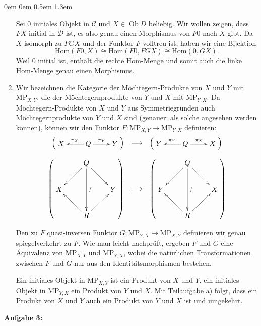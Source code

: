 \documentclass[a4paper,ngerman]{scrartcl}
\theoremstyle{definition}
\theoremstyle{plain}
\theoremstyle{remark}
\newcommand{\C}{\mathcal{C}}
\newcommand{\Hom}{\mathrm{Hom}}
\newcommand{\MP}{\mathrm{MP}}
\DeclareMathOperator{\Ob}{Ob}
\newcommand{\D}{\mathcal{D}}
\begin{document}
\begin{list}{}{0em \leftmargin0em \itemindent0.5em \itemsep 1.3em}
\begin{enumerate}
Sei $0$ initiales Objekt in $\C$ und $X \in \Ob D$ beliebig. Wir wollen zeigen, dass $FX$ initial in $\D$ ist, es also genau einen Morphismus von $F0$ nach $X$ gibt.
Da $X$ isomorph zu $FGX$ und der Funktor $F$ volltreu ist, haben wir eine Bijektion
\[ \Hom(F0, X) \cong \Hom(F0, FGX) \cong \Hom(0, GX). \]
Weil $0$ initial ist, enthält die rechte Hom-Menge und somit auch die linke Hom-Menge genau einen Morphismus.
\item Wir bezeichnen die Kategorie der Möchtegern-Produkte von $X$ und $Y$ mit $\MP_{X,Y}$, die der Möchtegernprodukte von $Y$ und $X$ mit $\MP_{Y,X}$. Da Möchtegern-Produkte von $X$ und $Y$ aus Symmetriegründen auch Möchtegernprodukte von $Y$ und $X$ sind (genauer: als solche angesehen werden können), können wir den Funktor $F : \MP_{X,Y} \to \MP_{Y,X}$ definieren:
\[ \begin{array}{@{}rcl@{}}
  \left(\vcenter{\xymatrix{X & \ar[l]_{\pi_X} Q \ar[r]^{\pi_Y} & Y}}\right) & \longmapsto & \left(\vcenter{\xymatrix{Y & \ar[l]_{\pi_Y} Q \ar[r]^{\pi_X} & X}}\right) \\\\
  \left(\vcenter{\xymatrix{
    & Q \ar[ld] \ar[dd]^{f} \ar[rd] \\
  X & & Y \\
    & R \ar[lu] \ar[ru]
  }}\right)
  & \longmapsto &
  \left(\vcenter{\xymatrix{
    & Q \ar[ld] \ar[dd]^{f} \ar[rd] \\
  Y & & X \\
    & R \ar[lu] \ar[ru]
  }}\right)
\end{array} \]

Den zu $F$ quasi-inversen Funktor $G:\MP_{Y,X} \to \MP_{X,Y}$ definieren wir genau spiegelverkehrt zu $F$. Wie man leicht nachprüft, ergeben $F$ und $G$ eine Äquivalenz von $\MP_{X,Y}$ und $\MP_{Y,X}$, wobei die natürlichen Transformationen zwischen $F$ und $G$ nur aus den Identitätsmorphismen bestehen.

Ein initiales Objekt in $\MP_{X,Y}$ ist ein Produkt von $X$ und $Y$, ein initiales Objekt in $\MP_{Y,X}$ ein Produkt von $Y$ und $X$. Mit Teilaufgabe a) folgt, dass ein Produkt von $X$ und $Y$ auch ein Produkt von $Y$ und $X$ ist und umgekehrt.

\end{enumerate}

\item[\textbf{Aufgabe 3:}]\mbox{}


\end{list}
\end{document}
